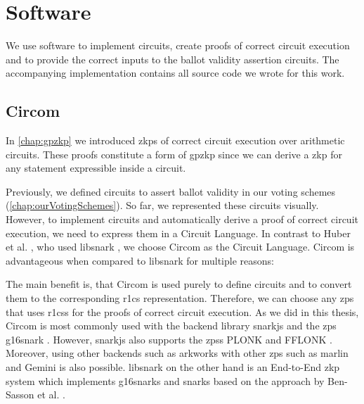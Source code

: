\chapter{Software}
\label{chap:software}

We use software to implement circuits, create proofs of correct circuit execution and to provide the correct inputs to the ballot validity assertion circuits.
The accompanying implementation contains all source code we wrote for this work.

\section{Circom}

In \cref{chap:gpzkp} we introduced \glspl{zkp} of correct circuit execution over arithmetic circuits.
These proofs constitute a form of \gls{gpzkp} since we can derive a \gls{zkp} for any statement expressible inside a circuit.

Previously, we defined circuits to assert ballot validity in our voting schemes (\cref{chap:ourVotingSchemes}).
So far, we represented these circuits visually.
However, to implement circuits and automatically derive a proof of correct circuit execution, we need to express them in a Circuit Language.
In contrast to Huber et al. \cite{huber_zk-snarks_2025}, who used libsnark \cite{madars_virza_scipr-lablibsnark_2025}, we choose Circom \cite{rodriguez_circom_2025} as the Circuit Language.
Circom is advantageous when compared to libsnark for multiple reasons:

The main benefit is, that Circom is used purely to define circuits and to convert them to the corresponding \gls{r1cs} representation. 
Therefore, we can choose any \gls{zps} that uses \glspl{r1cs} for the proofs of correct circuit execution.
As we did in this thesis, Circom is most commonly used with the backend library snarkjs \cite{jordi_baylina_iden3snarkjs_2025} and the \gls{zps} \gls{g16snark} \cite{groth_size_2016}.
However, snarkjs also supports the \glspl{zps} PLONK \cite{gabizon_plonk_2019} and FFLONK \cite{gabizon_fflonk_2021}.
Moreover, using other backends such as arkworks \cite{yuncong_hu_arkworks_2025} with other \gls{zps} such as marlin \cite{chiesa_marlin_2019,pratyush_mishra_arkworks-rsmarlin_2025} and Gemini \cite{bootle_gemini_2022} is also possible.
libsnark on the other hand is an End-to-End \gls{zkp} system which implements \glspl{g16snark} and \glspl{snark} based on the approach by Ben-Sasson et al. \cite{ben-sasson_succinct_2013}.

